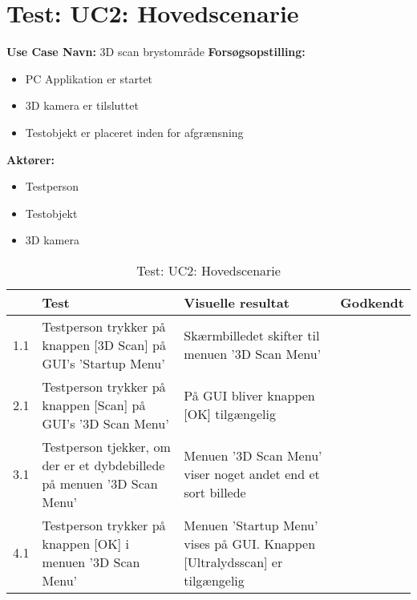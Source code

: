 
\section{Test: UC2: Hovedscenarie}
\textbf{Use Case Navn:} 3D scan brystområde \newline
\textbf{Forsøgsopstilling:}
\begin{itemize}
\item PC Applikation  er startet
\item 3D kamera er tilsluttet
\item Testobjekt er placeret inden for afgrænsning
\end{itemize}  
\textbf{Aktører:}
\begin{itemize}
\item Testperson
\item Testobjekt
\item 3D kamera
\end{itemize}  

\begin{table}[htb]
\begin{tabularx}{\textwidth}{|p{0.5cm}|X|X|p{2cm}|}
\hline
\textbf{} & \textbf{Test} & \textbf{Visuelle resultat} &\textbf{Godkendt} \\\hline
1.1 & Testperson trykker på knappen [3D Scan] på GUI's 'Startup Menu' & Skærmbilledet skifter til menuen '3D Scan Menu' &  \\\hline
2.1 & Testperson trykker på knappen [Scan] på GUI's '3D Scan Menu' & På GUI bliver knappen [OK] tilgængelig &  \\\hline
3.1 & Testperson tjekker, om der er et dybdebillede på menuen '3D Scan Menu' & Menuen '3D Scan Menu' viser noget andet end et sort billede & \\\hline
4.1 & Testperson trykker på knappen [OK] i menuen '3D Scan Menu' & Menuen 'Startup Menu' vises på GUI. Knappen [Ultralydsscan] er tilgængelig & \\\hline
\end{tabularx}
    \caption{Test: UC2: Hovedscenarie}
    \label{uc2_test_h_label}  
\end{table}
\newpage


